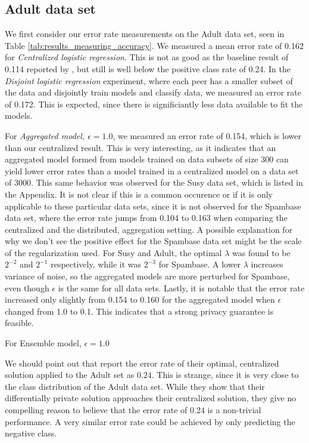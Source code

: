 \subsection{Adult data set}

We first consider our error rate measurements on the Adult data set, seen in Table \ref{tab:results_measuring_accuracy}. We measured a mean error rate of 0.162 for \textit{Centralized logistic regression}. This is not as good as the baseline result of 0.114 reported by \citep{caruana2006empirical}, but still is well below the positive class rate of 0.24. In the \textit{Disjoint logistic regression} experiment, where each peer has a smaller subset of the data and disjointly train models and classify data, we measured an error rate of 0.172. This is expected, since there is significiantly less data available to fit the models. 

For \textit{Aggregated model, $\epsilon=1.0$}, we measured an error rate of 0.154, which is lower than our centralized result. This is very interesting, as it indicates that an aggregated model formed from models trained on data subsets of size 300 can yield lower error rates than a model trained in a centralized model on a data set of 3000. This same behavior was observed for the Susy data set, which is listed in the Appendix. It is not clear if this is a common occurence or if it is only applicable to these particular data sets, since it is not observed for the Spambase data set, where the error rate jumps from 0.104 to 0.163 when comparing the centralized and the distributed, aggregation setting. A possible explanation for why we don't see the positive effect for the Spambase data set might be the scale of the regularization used. For Susy and Adult, the optimal $\lambda$ was found to be $2^{-2}$ and $2^{-1}$ respectively, while it was $2^{-3}$ for Spambase. A lower $\lambda$ increases variance of noise, so the aggregated models are more perturbed for Spambase, even though $\epsilon$ is the same for all data sets. Lastly, it is notable that the error rate increased only slightly from 0.154 to 0.160 for the aggregated model when $\epsilon$ changed from 1.0 to 0.1. This indicates that a strong privacy guarantee is feasible.

For Ensemble model, $\epsilon=1.0$

We should point out that \cite{pathak2010diffprivhomo} report the error rate of their optimal, centralized solution applied to the Adult set as $0.24$. This is strange, since it is very close to the class distribution of the Adult data set. While they show that their differentially private solution approaches their centralized solution, they give no compelling reason to believe that the error rate of $0.24$ is a non-trivial performance. A very similar error rate could be achieved by only predicting the negative class.



